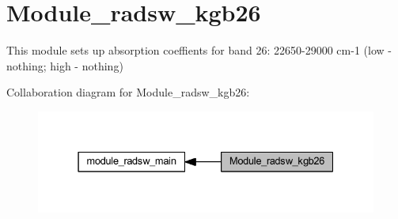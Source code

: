\hypertarget{group__module__radsw__kgb26}{}\section{Module\+\_\+radsw\+\_\+kgb26}
\label{group__module__radsw__kgb26}


This module sets up absorption coeffients for band 26\+: 22650-\/29000 cm-\/1 (low -\/ nothing; high -\/ nothing)  


Collaboration diagram for Module\+\_\+radsw\+\_\+kgb26\+:\nopagebreak
\begin{figure}[H]
\begin{center}
\leavevmode
\includegraphics[width=331pt]{group__module__radsw__kgb26}
\end{center}
\end{figure}

